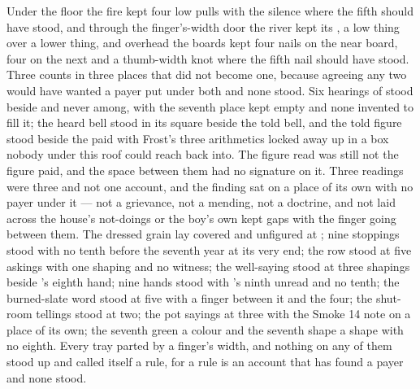 Under the floor the fire kept four low pulls with the silence where the fifth should have stood, and through the finger's-width door the river kept its , a low thing over a lower thing, and overhead the boards kept four nails on the near board, four on the next and a thumb-width knot where the fifth nail should have stood. Three counts in three places that did not become one, because agreeing any two would have wanted a payer put under both and none stood. Six hearings of  stood beside and never among, with the seventh place kept empty and none invented to fill it; the heard bell stood in its square beside the told bell, and the told figure stood beside the paid with Frost's three arithmetics locked away up  in a box nobody under this roof could reach back into. The figure read was still not the figure paid, and the space between them had no signature on it. Three readings were three and not one account, and the finding sat on a place of its own with no payer under it --- not a grievance, not a mending, not a doctrine, and not laid across the house's not-doings or the boy's own kept gaps with the finger going between them. The dressed grain lay covered and unfigured at ; nine stoppings stood with no tenth before the seventh year at its very end; the row stood at five askings with one shaping and no witness; the well-saying stood at three shapings beside 's eighth hand; nine hands stood with 's ninth unread and no tenth; the burned-slate word stood at five with a finger between it and the four; the shut-room tellings stood at two; the pot sayings at three with the Smoke 14 note on a place of its own; the seventh green a colour and the seventh shape a shape with no eighth. Every tray parted by a finger's width, and nothing on any of them stood up and called itself a rule, for a rule is an account that has found a payer and none stood.

